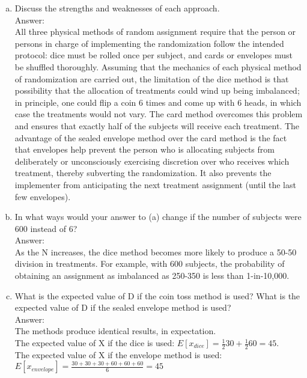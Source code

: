 \documentclass[11pt,notitlepage]{article}		%
\begin{document}
\begin{enumerate}[a)]
\item Discuss the strengths and weaknesses of each approach.\\
Answer:\\
All three physical methods of random assignment require that the person or persons in charge of implementing the randomization follow the intended protocol: dice must be rolled once per subject, and cards or envelopes must be shuffled thoroughly. Assuming that the mechanics of each physical method of randomization are carried out, the limitation of the dice method is that possibility that the allocation of treatments could wind up being imbalanced; in principle, one could flip a coin 6 times and come up with 6 heads, in which case the treatments would not vary. The card method overcomes this problem and ensures that exactly half of the subjects will receive each treatment. The advantage of the sealed envelope method over the card method is the fact that envelopes help prevent the person who is allocating subjects from deliberately or unconsciously exercising discretion over who receives which treatment, thereby subverting the randomization.  It also prevents the implementer from anticipating the next treatment assignment (until the last few envelopes).
\item In what ways would your answer to (a) change if the number of subjects were 600 instead of 6?  \\
Answer:\\
As the N increases, the dice method becomes more likely to produce a 50-50 division in treatments. For example, with 600 subjects, the probability of obtaining an assignment as imbalanced as 250-350 is less than 1-in-10,000. 
\item What is the expected value of D if the coin toss method is used?  What is the expected value of D if the sealed envelope method is used? \\
Answer:\\
The methods produce identical results, in expectation. \\
The expected value of X if the dice is used: $E[x_{dice}]=\frac{1}{2} 30+ \frac{1}{2} 60=45$.  \\
The expected value of X if the envelope method is used: $E[x_{envelope}]=\frac{30+30+30+60+60+60}{6}=45$\\
\end{enumerate}
\end{document}
